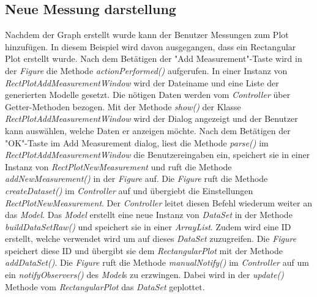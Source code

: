 \documentclass[a4paper,oneside,abstract,numbers=noenddot]{scrreprt}
\begin{document}
\subsection{Neue Messung darstellung}
Nachdem der Graph erstellt wurde kann der Benutzer Messungen zum Plot hinzufügen. In diesem Beispiel wird davon ausgegangen, dass ein Rectangular Plot erstellt wurde. Nach dem Betätigen der "{}Add Measurement"{}-Taste wird in der \textit{Figure} die Methode \textit{actionPerformed()} aufgerufen. In einer Instanz von \textit{RectPlotAddMeasurementWindow} wird der Dateiname und eine Liste der generierten Modelle gesetzt. Die nötigen Daten werden vom \textit{Controller} über Getter-Methoden bezogen. Mit der Methode \textit{show()} der Klasse \textit{RectPlotAddMeasurementWindow} wird der Dialog angezeigt und der Benutzer kann auswählen, welche Daten er anzeigen möchte. Nach dem Betätigen der "{}OK"{}-Taste im Add Measurement dialog, liest die Methode \textit{parse()} im \textit{RectPlotAddMeasurementWindow} die Benutzereingaben ein, speichert sie in einer Instanz von \textit{RectPlotNewMeasurement} und ruft die Methode \textit{addNewMeasurement()} in der \textit{Figure} auf. Die \textit{Figure} ruft die Methode \textit{createDataset()} im \textit{Controller} auf und übergiebt die Einstellungen \textit{RectPlotNewMeasurement}. Der \textit{Controller} leitet diesen Befehl wiederum weiter an das \textit{Model}. Das \textit{Model} erstellt eine neue Instanz von \textit{DataSet} in der Methode \textit{buildDataSetRaw()} und speichert sie in einer \textit{ArrayList}. Zudem wird eine ID erstellt, welche verwendet wird um auf dieses \textit{DataSet} zuzugreifen. Die \textit{Figure} speichert diese ID und übergibt sie dem \textit{RectangularPlot} mit der Methode \textit{addDataSet()}. Die \textit{Figure} ruft die Methode \textit{manualNotify()} im \textit{Controller} auf um ein \textit{notifyObservers()} des \textit{Model}s zu erzwingen. Dabei wird in der \textit{update()} Methode vom \textit{RectangularPlot} das \textit{DataSet} geplottet.\\
\\
\end{document}
